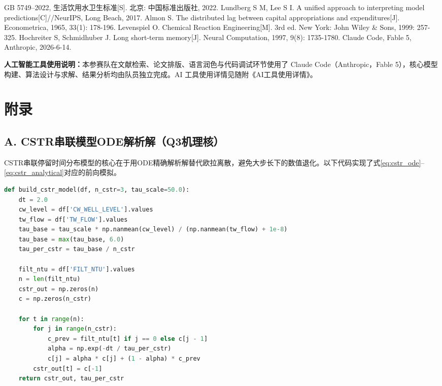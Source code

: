 \documentclass{cumcmthesis}
\begin{document}
\newpage
\begin{thebibliography}{9}
 GB 5749--2022, 生活饮用水卫生标准[S]. 北京: 中国标准出版社, 2022.
 Lundberg S M, Lee S I. A unified approach to interpreting model predictions[C]//NeurIPS, Long Beach, 2017.
 Almon S. The distributed lag between capital appropriations and expenditures[J]. Econometrica, 1965, 33(1): 178-196.
 Levenspiel O. Chemical Reaction Engineering[M]. 3rd ed. New York: John Wiley \& Sons, 1999: 257-325.
 Hochreiter S, Schmidhuber J. Long short-term memory[J]. Neural Computation, 1997, 9(8): 1735-1780.
 Claude Code, Fable 5, Anthropic, 2026-6-14.
\end{thebibliography}

\vspace{1em}
\noindent\textbf{人工智能工具使用说明：}本参赛队在文献检索、论文排版、语言润色与代码调试环节使用了 Claude Code（Anthropic，Fable 5），核心模型构建、算法设计与求解、结果分析均由队员独立完成。AI 工具使用详情见随附《AI工具使用详情》。

\newpage
\section*{附录}

\subsection*{A. CSTR串联模型ODE解析解（Q3机理核）}
CSTR串联停留时间分布模型的核心在于用ODE精确解析解替代欧拉离散，避免大步长下的数值退化。以下代码实现了式\eqref{eq:cstr_ode}--\eqref{eq:cstr_analytical}对应的前向模拟。

\begin{lstlisting}[language=python, caption={CSTR串联解析解前向模拟}, label={lst:cstr}]
def build_cstr_model(df, n_cstr=3, tau_scale=50.0):
    dt = 2.0
    cw_level = df['CW_WELL_LEVEL'].values
    tw_flow = df['TW_FLOW'].values
    tau_base = tau_scale * np.nanmean(cw_level) / (np.nanmean(tw_flow) + 1e-8)
    tau_base = max(tau_base, 6.0)
    tau_per_cstr = tau_base / n_cstr

    filt_ntu = df['FILT_NTU'].values
    n = len(filt_ntu)
    cstr_out = np.zeros(n)
    c = np.zeros(n_cstr)

    for t in range(n):
        for j in range(n_cstr):
            c_prev = filt_ntu[t] if j == 0 else c[j - 1]
            alpha = np.exp(-dt / tau_per_cstr)
            c[j] = alpha * c[j] + (1 - alpha) * c_prev
        cstr_out[t] = c[-1]
    return cstr_out, tau_per_cstr
\end{lstlisting}
\end{document}
